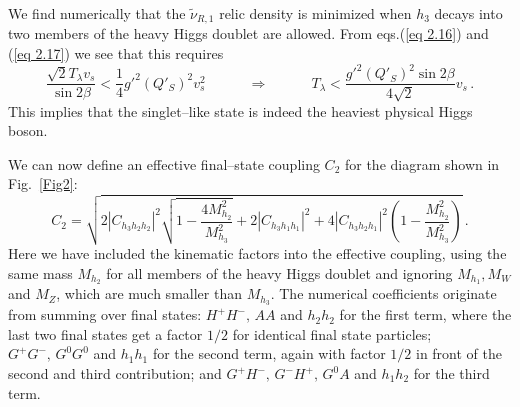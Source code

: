\documentclass[a4paper,11pt]{article}
\begin{document}
We find numerically that the $\tilde \nu_{R,1}$ relic density is minimized
when $h_3$ decays into two members of the heavy Higgs doublet are
allowed. From eqs.(\ref{eq 2.16}) and (\ref{eq 2.17}) we see that
this requires
%
\begin{equation}  \label{eq 3.2}
\frac{ \sqrt{2}  T_\lambda v_s } {\sin{2\beta}} <  
\frac{1}{4} g'^2 \left( Q'_S \right)^2 v_s^2  \quad\quad\quad \Rightarrow 
\quad\quad\quad T_\lambda < \frac {g'^2 \left( Q'_S \right)^2 
\sin{2\beta}} {4 \sqrt{2}} v_s\,.
\end{equation}
%
This implies that the singlet--like state is indeed the heaviest physical
Higgs boson. 

We can now define an effective final--state coupling $C_2$ for the diagram
shown in Fig.~\ref{Fig2}:
%
\begin{equation} \label{eq 3.8}
C_2 = \sqrt{ 2 \left| C_{h_3 h_2 h_2} \right|^2 \sqrt{ 1 - 
\frac{4 M_{h_2}^2} {M_{h_3}^2} } + 2 \left| C_{h_3 h_1 h_1} \right|^2
+ 4 \left| C_{h_3 h_2 h_1} \right|^2 \left( 1 - \frac{ M_{h_2}^2} {M_{h_3}^2} 
\right)} \,.
\end{equation}
%
Here we have included the kinematic factors into the effective
coupling, using the same mass $M_{h_2}$ for all members of the heavy
Higgs doublet and ignoring $M_{h_1}, M_W$ and $M_Z$, which are much
smaller than $M_{h_3}$. The numerical coefficients originate from
summing over final states: $H^+ H^-, \, A A$ and $h_2 h_2$ for the
first term, where the last two final states get a factor $1/2$ for
identical final state particles; $G^+ G^-, \, G^0 G^0$ and $h_1 h_1$
for the second term, again with factor $1/2$ in front of the second
and third contribution; and $G^+ H^-,\, G^- H^+,\, G^0 A$ and
$h_1 h_2$ for the third term.
\end{document}
